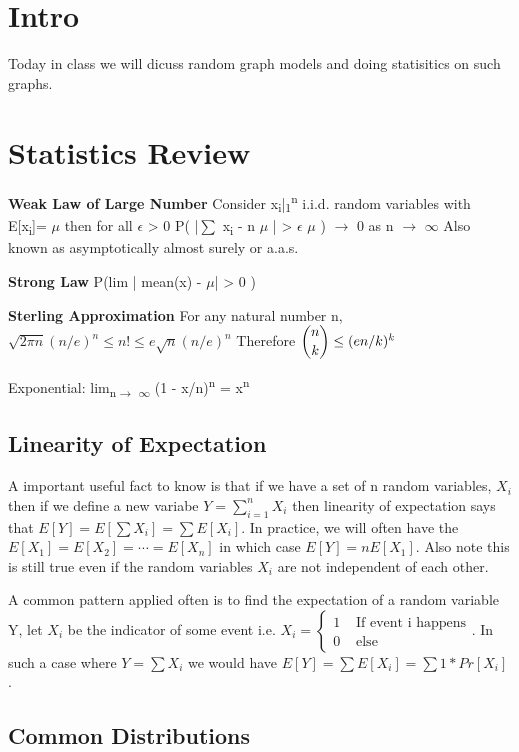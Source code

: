 \documentclass[11pt]{article}
\author{Calvin Roth}
\date{\today}
\title{}
\begin{document}
\section{Intro}
\label{sec:org601d5dd}
Today in class we will dicuss random graph models and doing statisitics on such graphs.

\section{Statistics Review}
\label{sec:org20cecfd}
\textbf{Weak Law of Large Number} Consider x\textsubscript{i}|\textsubscript{1}\textsuperscript{n} i.i.d. random variables with E[x\textsubscript{i}]= \(\mu\) then for all \(\epsilon\) > 0
P( |\(\sum\) x\textsubscript{i} - n \(\mu\) | > \(\epsilon\) \(\mu\) ) \(\to\) 0  as n \(\to\) \(\infty\)
Also known as asymptotically almost surely or a.a.s.

\textbf{Strong Law} P(lim | mean(x) - \(\mu\)| > 0 )

\textbf{Sterling Approximation} For any natural number n,
  $\sqrt{2\pi n} (n/e)^{n} \leq  n! \leq  e\sqrt{n} (n/e)^{n}$
  Therefore $\dbinom{n}{k} \leq (en/k)^{k}$

Exponential: lim\textsubscript{n\(\to\) \(\infty\)} (1 - x/n)\textsuperscript{n} = x\textsuperscript{n}

\subsection{Linearity of Expectation}
\label{sec:org560b2d0}
A important useful fact to know is that if we have a set of n random variables, \(X_{i}\) then if we define a new variabe \(Y = \sum_{i=1}^{n} X_{i}\) then linearity of expectation says that \(E[Y] = E[\sum X_{i}] = \sum E[X_{i}]\). In practice, we will often have the \(E[X_{1}] = E[X_{2}] = \cdots = E[X_{n}]\) in which case \(E[Y] = n E[X_{1}]\). Also note this is still true even if the random variables \(X_{i}\) are not independent of each other.

A common pattern applied often is to find the expectation of a random variable Y, let \(X_{i}\) be the indicator of some event i.e. \(X_{i} = \begin{cases} 1 & \text{ If event i happens} \\ 0 & \text{ else} \end{cases}\). In such a case where \(Y = \sum X_{i}\) we would have \(E[Y] = \sum E[X_{i}] = \sum 1*Pr[X_{i}]\).


\subsection{Common Distributions}
\label{sec:org6b3cacb}
\end{document}
